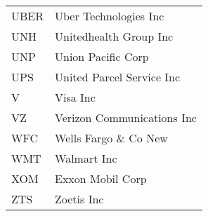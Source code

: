 \begin{tabular}{ll}
UBER   &             Uber Technologies Inc \\
UNH    &            Unitedhealth Group Inc \\
UNP    &                Union Pacific Corp \\
UPS    &         United Parcel Service Inc \\
V      &                          Visa Inc \\
VZ     &        Verizon Communications Inc \\
WFC    &             Wells Fargo \& Co New \\
WMT    &                       Walmart Inc \\
XOM    &                  Exxon Mobil Corp \\
ZTS    &                        Zoetis Inc \\
\bottomrule
\end{tabular}
